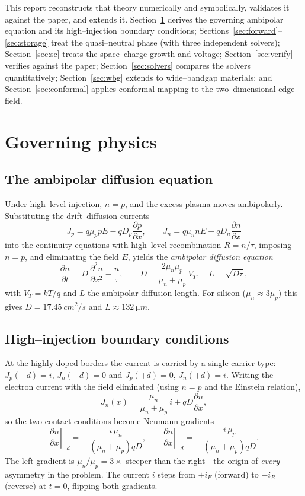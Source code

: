 \documentclass[11pt]{article}
\newcommand{\pdd}[2]{\frac{\partial #1}{\partial #2}}
\newcommand{\pddd}[2]{\frac{\partial^2 #1}{\partial #2^2}}
\begin{document}
This report reconstructs that theory numerically and symbolically, validates it
against the paper, and extends it. Section~\ref{sec:physics} derives the
governing ambipolar equation and its high--injection boundary conditions;
Sections~\ref{sec:forward}--\ref{sec:storage} treat the quasi--neutral phase
(with three independent solvers); Section~\ref{sec:sc} treats the space--charge
growth and voltage; Section~\ref{sec:verify} verifies against the paper;
Section~\ref{sec:solvers} compares the solvers quantitatively;
Section~\ref{sec:wbg} extends to wide--bandgap materials; and
Section~\ref{sec:conformal} applies conformal mapping to the two--dimensional
edge field.

\section{Governing physics}\label{sec:physics}
\subsection{The ambipolar diffusion equation}
Under high--level injection, $n=p$, and the excess plasma moves ambipolarly.
Substituting the drift--diffusion currents
\begin{equation}
J_p = q\mu_p p E - q D_p \pdd{p}{x}, \qquad
J_n = q\mu_n n E + q D_n \pdd{n}{x}
\end{equation}
into the continuity equations with high--level recombination $R=n/\tau$,
imposing $n=p$, and eliminating the field $E$, yields the \emph{ambipolar
diffusion equation}
\begin{equation}\label{eq:ambi}
\pdd{n}{t} = D\,\pddd{n}{x} - \frac{n}{\tau},
\qquad
D = \frac{2\mu_n\mu_p}{\mu_n+\mu_p}\,V_T,
\quad
L=\sqrt{D\tau},
\end{equation}
with $V_T=kT/q$ and $L$ the ambipolar diffusion length. For silicon
($\mu_n\approx3\mu_p$) this gives $D=\SI{17.45}{cm^2/s}$ and $L\approx\SI{132}{\micro m}$.

\subsection{High--injection boundary conditions}
At the highly doped borders the current is carried by a single carrier type:
$J_p(-d)=i,\,J_n(-d)=0$ and $J_p(+d)=0,\,J_n(+d)=i$. Writing the electron
current with the field eliminated (using $n=p$ and the Einstein relation),
\begin{equation}\label{eq:star}
J_n(x) = \frac{\mu_n}{\mu_n+\mu_p}\,i + q D \pdd{n}{x},
\end{equation}
so the two contact conditions become Neumann gradients
\begin{equation}\label{eq:bc}
\left.\pdd{n}{x}\right|_{-d} = -\,\frac{i\,\mu_n}{(\mu_n+\mu_p)qD},
\qquad
\left.\pdd{n}{x}\right|_{+d} = +\,\frac{i\,\mu_p}{(\mu_n+\mu_p)qD}.
\end{equation}
The left gradient is $\mu_n/\mu_p=3\times$ steeper than the right---the origin of
\emph{every} asymmetry in the problem. The current $i$ steps from $+i_F$
(forward) to $-i_R$ (reverse) at $t=0$, flipping both gradients.
\end{document}
